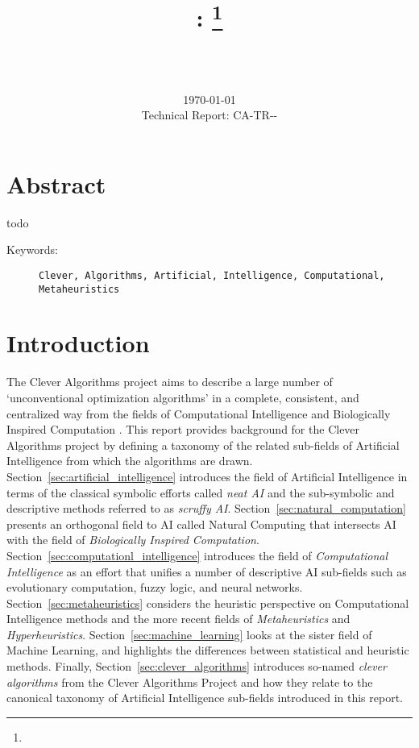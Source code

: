 \documentclass[a4paper, 11pt]{article}
\title{{\myreporttitle}: {\myreportsubtitle}\footnote{\myreportlicense}}
\author{\myreportauthor\\{\myreportemail}\\\small\myreportproject}
\date{\today\\{\small{Technical Report: CA-TR-{\myreportdate}-\myreportversion}}}
\begin{document}
\maketitle

\section*{Abstract} 
todo

\begin{description}
	\item[Keywords:] {\small\texttt{Clever, Algorithms, Artificial, Intelligence, Computational, Metaheuristics}}
\end{description} 

\section{Introduction}
\label{sec:introduction}
The Clever Algorithms project aims to describe a large number of `unconventional optimization algorithms' in a complete, consistent, and centralized way from the fields of Computational Intelligence and Biologically Inspired Computation \cite{Brownlee2010}.
This report provides background for the Clever Algorithms project by defining a taxonomy of the related sub-fields of Artificial Intelligence from which the algorithms are drawn.
Section~\ref{sec:artificial_intelligence} introduces the field of Artificial Intelligence in terms of the classical symbolic efforts called \emph{neat AI} and the sub-symbolic and descriptive methods referred to as \emph{scruffy AI}. Section~\ref{sec:natural_computation} presents an orthogonal field to AI called Natural Computing that intersects AI with the field of \emph{Biologically Inspired Computation}. Section~\ref{sec:computationl_intelligence} introduces the field of \emph{Computational Intelligence} as an effort that unifies a number of descriptive AI sub-fields such as evolutionary computation, fuzzy logic, and neural networks. Section~\ref{sec:metaheuristics} considers the heuristic perspective on Computational Intelligence methods and the more recent fields of \emph{Metaheuristics} and \emph{Hyperheuristics}. Section~\ref{sec:machine_learning} looks at the sister field of Machine Learning, and highlights the differences between statistical and heuristic methods. Finally, Section~\ref{sec:clever_algorithms} introduces so-named \emph{clever algorithms} from the Clever Algorithms Project and how they relate to the canonical taxonomy of Artificial Intelligence sub-fields introduced in this report.
\end{document}
